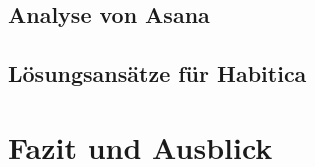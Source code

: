 \documentclass[sigconf, nonacm]{acmart}
\begin{document}
\subsection{Analyse von Asana}

\subsection{Lösungsansätze für Habitica}\label{sec:solutions_for_habitica}

\section{Fazit und Ausblick}




\end{document}
